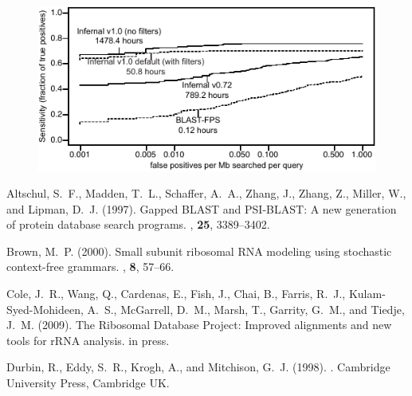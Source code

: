 \documentclass{bioinfo}
\begin{document}
\begin{application}
\begin{figure}[h]
\centerline{\includegraphics{figs/roc-short}}


\label{Fig:01}
\end{figure}


%
%


%

\begin{thebibliography}{}

Altschul, S.~F., Madden, T.~L., Schaffer, A.~A., Zhang, J., Zhang, Z., Miller,
  W., and Lipman, D.~J. (1997).
\newblock Gapped {BLAST} and {PSI-BLAST}: A new generation of protein database
  search programs.
, {\bf 25}, 3389--3402.

Brown, M.~P. (2000).
\newblock Small subunit ribosomal {RNA} modeling using stochastic context-free
  grammars.
, {\bf 8}, 57--66.

Cole, J.~R., Wang, Q., Cardenas, E., Fish, J., Chai, B., Farris, R.~J.,
  Kulam-Syed-Mohideen, A.~S., McGarrell, D.~M., Marsh, T., Garrity, G.~M., and
  Tiedje, J.~M. (2009).
\newblock The {R}ibosomal {D}atabase {P}roject: Improved alignments and new
  tools for {rRNA} analysis.
\newblock in press.

Durbin, R., Eddy, S.~R., Krogh, A., and Mitchison, G.~J. (1998).
.
\newblock Cambridge University Press, Cambridge UK.


\end{thebibliography}
\end{application}
\end{document}
